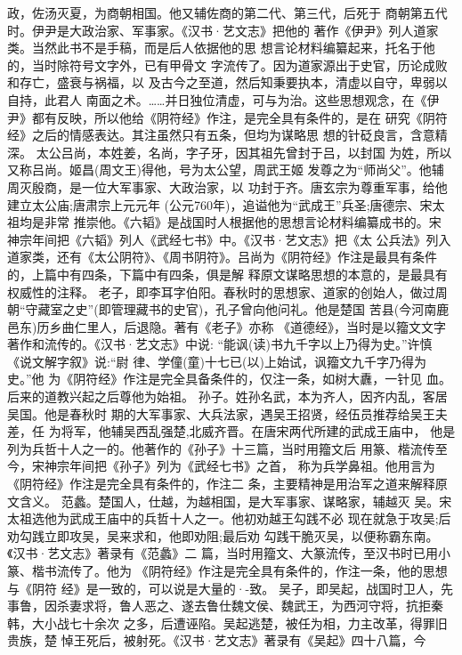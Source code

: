 \documentclass[12pt,UTF8]{ctexbook}
\begin{document}
政，佐汤灭夏，为商朝相国。他又辅佐商的第二代、第三代，后死于
商朝第五代时。伊尹是大政治家、军事家。《汉书·艺文志》把他的
著作《伊尹》列人道家类。当然此书不是手稿，而是后人依据他的思
想言论材料编纂起来，托名于他的，当时除符号文字外，已有甲骨文
字流传了。因为道家源出于史官，历论成败和存亡，盛衰与祸福，以
及古今之至道，然后知秉要执本，清虚以自守，卑弱以自持，此君人
南面之术。……并日独位清虚，可与为治。这些思想观念，在《伊
尹》都有反映，所以他给《阴符经》作注，是完全具有条件的，是在
研究《阴符经》之后的情感表达。其注虽然只有五条，但均为谋略思
想的针砭良言，含意精深。
太公吕尚，本姓姜，名尚，字子牙，因其祖先曾封于吕，以封国
为姓，所以又称吕尚。姬昌(周文王)得他，号为太公望，周武王姬
发尊之为“师尚父”。他辅周灭殷商，是一位大军事家、大政治家，以
功封于齐。唐玄宗为尊重军事，给他建立太公庙;唐肃宗上元元年
(公元760年)，追谥他为“武成王”兵圣;唐德宗、宋太祖均是非常
推崇他。《六韬》是战国时人根据他的思想言论材料编纂成书的。宋
神宗年间把《六韬》列人《武经七书》中。《汉书·艺文志》把《太
公兵法》列入道家类，还有《太公阴符》、《周书阴符》。吕尚为《阴符经》作注是最具有条件的，上篇中有四条，下篇中有四条，俱是解
释原文谋略思想的本意的，是最具有权威性的注释。
老子，即李耳字伯阳。春秋时的思想家、道家的创始人，做过周
朝“守藏室之史”(即管理藏书的史官)，孔子曾向他问礼。他是楚国
苦县(今河南鹿邑东)历乡曲仁里人，后退隐。著有《老子》亦称
《道德经》，当时是以籀文文字著作和流传的。《汉书·艺文志》中说:
“能讽(读)书九千字以上乃得为史。”许慎《说文解字叙》说:“尉
律、学僮(童)十七已(以)上始试，讽籀文九千字乃得为史。”他
为《阴符经》作注是完全具备条件的，仅注一条，如树大纛，一针见
血。后来的道教兴起之后尊他为始祖。
孙子。姓孙名武，本为齐人，因齐内乱，客居吴国。他是春秋时
期的大军事家、大兵法家，遇吴王招贤，经伍员推荐给吴王夫差，任
为将军，他辅吴西乱强楚,北威齐晋。在唐宋两代所建的武成王庙中，
他是列为兵哲十人之一的。他著作的《孙子》十三篇，当时用籀文后
用篆、楷流传至今，宋神宗年间把《孙子》列为《武经七书》之首，
称为兵学鼻祖。他用言为《阴符经》作注是完全具有条件的，作注二
条，主要精神是用治军之道来解释原文含义。
范蠡。楚国人，仕越，为越相国，是大军事家、谋略家，辅越灭
吴。宋太祖选他为武成王庙中的兵哲十人之一。他初劝越王勾践不必
现在就急于攻吴;后劝勾践立即攻吴，吴来求和，他即劝阻;最后劝
勾践干脆灭吴，以便称霸东南。《汉书·艺文志》著录有《范蠡》二
篇，当时用籀文、大篆流传，至汉书时已用小篆、楷书流传了。他为
《阴符经》作注是完全具有条件的，作注一条，他的思想与《阴符
经》是一致的，可以说是大量的·-致。
吴子，即吴起，战国时卫人，先事鲁，因杀妻求将，鲁人恶之、遂去鲁仕魏文侯、魏武王，为西河守将，抗拒秦韩，大小战七十余次
之多，后遭诬陷。吴起逃楚，被任为相，力主改革，得罪旧贵族，楚
悼王死后，被射死。《汉书·艺文志》著录有《吴起》四十八篇，今
\end{document}
